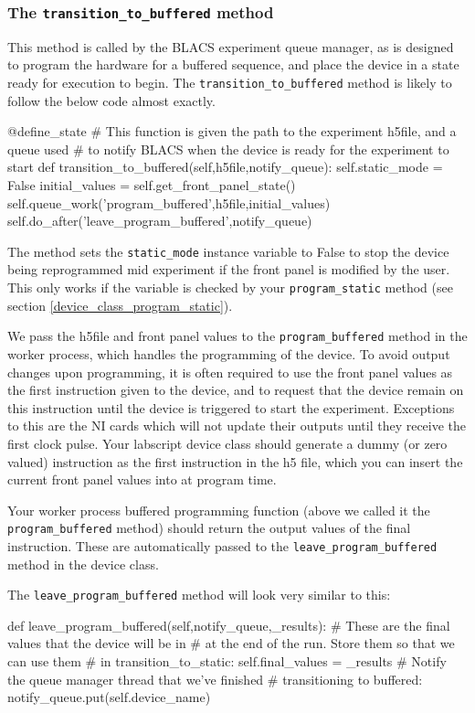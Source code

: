 \documentclass[12pt]{article}
\begin{document}
\subsubsection{The \texttt{transition\_to\_buffered} method}\label{device_class_transition_to_buffered}
This method is called by the BLACS experiment queue manager, as is designed to program the hardware for a buffered sequence, and place the device in a state ready for execution to begin. The \texttt{transition\_to\_buffered} method is likely to follow the below code almost exactly.
\begin{python}
@define_state
    # This function is given the path to the experiment h5file, and a queue used
    # to notify BLACS when the device is ready for the experiment to start
    def transition_to_buffered(self,h5file,notify_queue):
        self.static_mode = False 
        initial_values = self.get_front_panel_state()
        self.queue_work('program_buffered',h5file,initial_values)
        self.do_after('leave_program_buffered',notify_queue)
\end{python}

The method sets the \texttt{static\_mode} instance variable to False to stop the device being reprogrammed mid experiment if the front panel is modified by the user. This only works if the variable is checked by your \texttt{program\_static} method (see section \ref{device_class_program_static}).

We pass the h5file and front panel values to the \texttt{program\_buffered} method in the worker process, which handles the programming of the device. To avoid output changes upon programming, it is often required to use the front panel values as the first instruction given to the device, and to request that the device remain on this instruction until the device is triggered to start the experiment. Exceptions to this are the NI cards which will not update their outputs until they receive the first clock pulse. Your labscript device class should generate a dummy (or zero valued) instruction as the first instruction in the h5 file, which you can insert the current front panel values into at program time.

Your worker process buffered programming function (above we called it the \texttt{program\_buffered} method) should return the output values of the final instruction. These are automatically passed to the \texttt{leave\_program\_buffered} method in the device class.

The \texttt{leave\_program\_buffered} method will look very similar to this:
\begin{python}
    def leave_program_buffered(self,notify_queue,_results):
        # These are the final values that the device will be in
        # at the end of the run. Store them so that we can use them
        # in transition_to_static:
        self.final_values = _results
        # Notify the queue manager thread that we've finished
        # transitioning to buffered:
        notify_queue.put(self.device_name)
\end{python}
\end{document}
